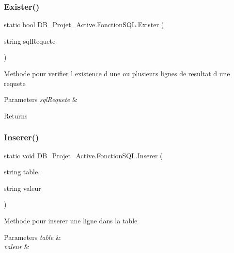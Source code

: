 \subsubsection{Exister()}
{\footnotesize\ttfamily static bool D\+B\+\_\+\+Projet\+\_\+\+Active.\+Fonction\+S\+Q\+L.\+Exister (\begin{DoxyParamCaption}\item[{string}]{sql\+Requete }\end{DoxyParamCaption})\hspace{0.3cm}{\ttfamily [static]}}



Methode pour verifier l existence d une ou plusieurs lignes de resultat d une requete 


\begin{DoxyParams}{Parameters}
{\em sql\+Requete} & \\
\hline
\end{DoxyParams}
\begin{DoxyReturn}{Returns}

\end{DoxyReturn}
\mbox{\label{class_d_b___projet___active_1_1_fonction_s_q_l_ae0498a4760c8ae68385692b06716adfc}} 
\subsubsection{Inserer()}
{\footnotesize\ttfamily static void D\+B\+\_\+\+Projet\+\_\+\+Active.\+Fonction\+S\+Q\+L.\+Inserer (\begin{DoxyParamCaption}\item[{string}]{table,  }\item[{string}]{valeur }\end{DoxyParamCaption})\hspace{0.3cm}{\ttfamily [static]}}



Methode pour inserer une ligne dans la table 


\begin{DoxyParams}{Parameters}
{\em table} & \\
\hline
{\em valeur} & \\
\hline
\end{DoxyParams}
\mbox{\label{class_d_b___projet___active_1_1_fonction_s_q_l_a932d9adcf7a102f4580dec18dd3f6966}} 
